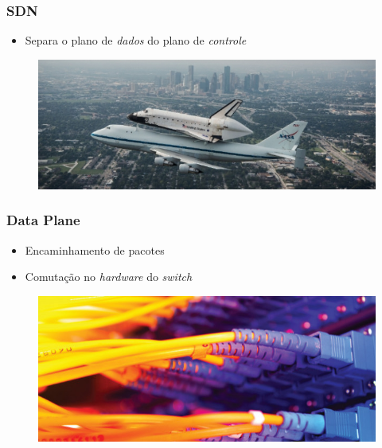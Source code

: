 %
%
\begin{frame}\frametitle{SDN}

    \begin{itemize}
    \item Separa o plano de \emph{dados} do plano de \emph{controle}
    \end{itemize}
    	\begin{figure}[h]
        \centering
        \includegraphics[scale=0.5]{images/planes.jpg}
    \end{figure}
\end{frame}


%
%
\begin{frame}\frametitle{Data Plane}

    \begin{itemize}
    \item Encaminhamento de pacotes
    \item Comutação no \emph{hardware} do \emph{switch}
    \end{itemize}
    	\begin{figure}[h]
        \centering
        \includegraphics[scale=2.0]{images/data-plane.png}
    \end{figure}
\end{frame}


